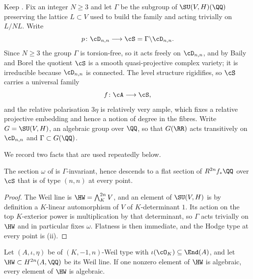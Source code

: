 \begin{setupenv}\label{setup:shimura}
Keep . Fix an integer $N\ge3$ and let $\Gamma$ be the
subgroup of $\SU(V,H)(\QQ)$ preserving the lattice $L\subset V$ used to build
the family and acting trivially on $L/NL$. Write
\[
  p\colon\cD_{n,n}\longrightarrow\cS=\Gamma\backslash\cD_{n,n} .
\]
Since $N\ge3$ the group $\Gamma$ is torsion-free, so it acts freely on
$\cD_{n,n}$, and by Baily and Borel \cite{BB66} the quotient $\cS$ is a smooth
quasi-projective complex variety; it is irreducible because $\cD_{n,n}$ is
connected. The level structure rigidifies, so $\cS$ carries a universal family
\[
  f\colon\cA\longrightarrow\cS,
\]
and the relative polarisation $3\eta$ is relatively very ample, which fixes a
relative projective embedding and hence a notion of degree in the fibres.
Write $G=\SU(V,H)$, an algebraic group over $\QQ$, so that
$G(\RR)$ acts transitively on $\cD_{n,n}$ and $\Gamma\subset G(\QQ)$.
\end{setupenv}

We record two facts that are used repeatedly below.

\begin{lemma}\label{lem:omegadescends}
The section $\omega$ of  is $\Gamma$-invariant, hence
descends to a flat section of $R^{2n}f_{*}\QQ$ over $\cS$ that is of type
$(n,n)$ at every point.
\end{lemma}

\begin{proof}
The Weil line is $\HW=\bigwedge^{2n}_{K}V$, and an element of $\SU(V,H)$ is by
definition a $K$-linear automorphism of $V$ of $K$-determinant $1$. Its action
on the top $K$-exterior power is multiplication by that determinant, so
$\Gamma$ acts trivially on $\HW$ and in particular fixes $\omega$. Flatness is
then immediate, and the Hodge type at every point is
(ii).
\end{proof}

\begin{lemma}\label{lem:onecomponent}
Let $(A,\iota,\eta)$ be of $(K,-1,n)$-Weil type with
$\iota(\cO_{K})\subseteq\End(A)$, and let $\HW\subset H^{2n}(A,\QQ)$ be its
Weil line. If one nonzero element of $\HW$ is algebraic, every element of
$\HW$ is algebraic.
\end{lemma}

